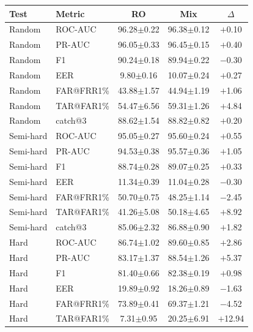\documentclass[11pt]{article}
\begin{document}
\begin{table}[!t]
\centering
\scriptsize
\begin{minipage}[t]{0.48\textwidth}
\centering
\begin{tabular}{l l c c c}
\toprule
\textbf{Test} & \textbf{Metric} & \textbf{RO} & \textbf{Mix} & \textbf{$\Delta$} \\
\midrule
Random    & ROC-AUC    & 96.28$\pm$0.22 & 96.38$\pm$0.12 & $+$0.10 \\
Random    & PR-AUC     & 96.05$\pm$0.33 & 96.45$\pm$0.15 & $+$0.40 \\
Random    & F1         & 90.24$\pm$0.18 & 89.94$\pm$0.22 & $-$0.30 \\
Random    & EER        & \phantom{0}9.80$\pm$0.16 & 10.07$\pm$0.24 & $+$0.27 \\
Random    & FAR@FRR1\% & 43.88$\pm$1.57 & 44.94$\pm$1.19 & $+$1.06 \\
Random    & TAR@FAR1\% & 54.47$\pm$6.56 & 59.31$\pm$1.26 & $+$4.84 \\
Random    & catch@3    & 88.62$\pm$1.54 & 88.82$\pm$0.82 & $+$0.20 \\
\midrule
Semi-hard & ROC-AUC    & 95.05$\pm$0.27 & 95.60$\pm$0.24 & $+$0.55 \\
Semi-hard & PR-AUC     & 94.53$\pm$0.38 & 95.57$\pm$0.36 & $+$1.05 \\
Semi-hard & F1         & 88.74$\pm$0.28 & 89.07$\pm$0.25 & $+$0.33 \\
Semi-hard & EER        & 11.34$\pm$0.39 & 11.04$\pm$0.28 & $-$0.30 \\
Semi-hard & FAR@FRR1\% & 50.70$\pm$0.75 & 48.25$\pm$1.14 & $-$2.45 \\
Semi-hard & TAR@FAR1\% & 41.26$\pm$5.08 & 50.18$\pm$4.65 & $+$8.92 \\
Semi-hard & catch@3    & 85.06$\pm$2.32 & 86.88$\pm$0.90 & $+$1.82 \\
\midrule
Hard      & ROC-AUC    & 86.74$\pm$1.02 & 89.60$\pm$0.85 & $+$2.86 \\
Hard      & PR-AUC     & 83.17$\pm$1.37 & 88.54$\pm$1.26 & $+$5.37 \\
Hard      & F1         & 81.40$\pm$0.66 & 82.38$\pm$0.19 & $+$0.98 \\
Hard      & EER        & 19.89$\pm$0.92 & 18.26$\pm$0.89 & $-$1.63 \\
Hard      & FAR@FRR1\% & 73.89$\pm$0.41 & 69.37$\pm$1.21 & $-$4.52 \\
Hard      & TAR@FAR1\% & \phantom{0}7.31$\pm$0.95 & 20.25$\pm$6.91 & $+$12.94 \\

\end{tabular}
\end{minipage}
\end{table}
\end{document}
